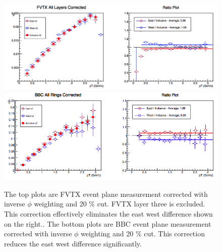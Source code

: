 \begin{figure}[!h]
\begin{center}
\includegraphics[width=0.75\linewidth]{figs/fvtx_corrected.png}
\includegraphics[width=0.75\linewidth]{figs/bbc_pp_correction.png}
\caption{The top plots are FVTX event plane measurement corrected with inverse $\phi$ weighting and 20 $\%$ cut. FVTX layer three is excluded. This correction effectively eliminates the east west difference shown on the right.. The bottom plots are BBC event plane measurement corrected with inverse $\phi$ weighting and 20 $\%$ cut. This correction reduces the east west difference significantly.}
\label{fig:fvtx_corrected_best}
\end{center}
\end{figure}


